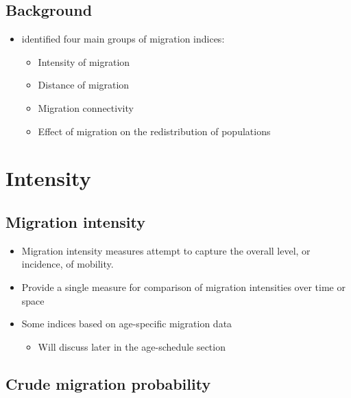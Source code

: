 \documentclass[
]{book}
\providecommand{\tightlist}{%
  \setlength{\itemsep}{0pt}\setlength{\parskip}{0pt}}
\begin{document}
\hypertarget{background-2}{%
\subsection{Background}\label{background-2}}

\begin{itemize}
\tightlist
\item
  \citet{Bell2002} identified four main groups of migration indices:

  \begin{itemize}
  \tightlist
  \item
    Intensity of migration
  \item
    Distance of migration
  \item
    Migration connectivity
  \item
    Effect of migration on the redistribution of populations
  \end{itemize}
\end{itemize}

\hypertarget{intensity}{%
\section{Intensity}\label{intensity}}

\hypertarget{migration-intensity}{%
\subsection{Migration intensity}\label{migration-intensity}}

\begin{itemize}
\tightlist
\item
  Migration intensity measures attempt to capture the overall level, or incidence, of mobility.
\item
  Provide a single measure for comparison of migration intensities over time or space
\item
  Some indices based on age-specific migration data

  \begin{itemize}
  \tightlist
  \item
    Will discuss later in the age-schedule section
  \end{itemize}
\end{itemize}

\hypertarget{crude-migration-probability}{%
\subsection{Crude migration probability}\label{crude-migration-probability}}
\end{document}
